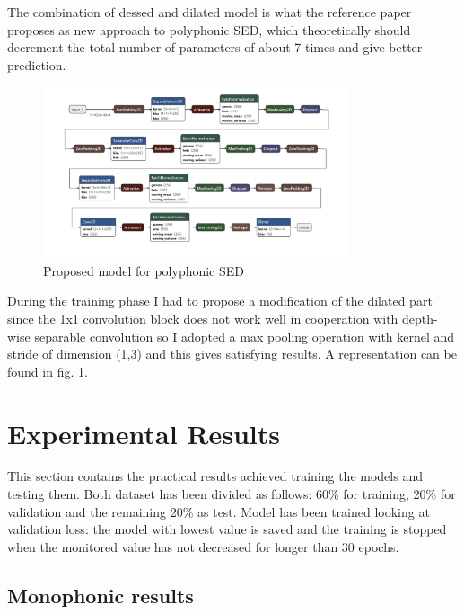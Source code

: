 \documentclass{article}
\begin{document}
The combination of dessed and dilated model is what the reference paper \cite{drossos2020sound} proposes as new approach to polyphonic SED, which theoretically should decrement the total number of parameters of about 7 times and give better prediction.

\begin{figure}[H]
	\centering
	\includegraphics[width=0.8\textwidth]{./images/poly/new model.png}	
	\caption{Proposed model for polyphonic SED}
	\label{fig:poly_new_model}
\end{figure}

During the training phase I had to propose a modification of the dilated part since the 1x1 convolution block does not work well in cooperation with depth-wise separable convolution so I adopted a max pooling operation with kernel and stride of dimension (1,3) and this gives satisfying results. A representation can be found in fig. \ref{fig:poly_new_model}.


\section{Experimental Results}
\label{sec:results}

This section contains the practical results achieved training the models and testing them. Both dataset has been divided as follows: 60\% for training, 20\% for validation and the remaining 20\% as test. Model has been trained looking at validation loss: the model with lowest value is saved and the training is stopped when the monitored value has not decreased for longer than 30 epochs.

\subsection{Monophonic results}
\label{subsec:mono_results}
\end{document}
